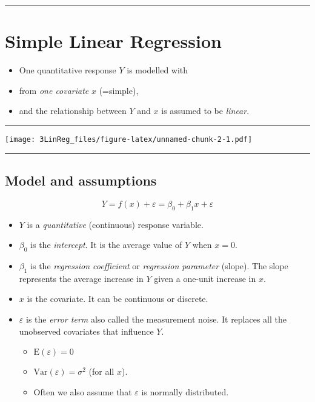 \documentclass[]{article}
\providecommand{\tightlist}{%
  \setlength{\itemsep}{0pt}\setlength{\parskip}{0pt}}
\begin{document}
\begin{center}\rule{0.5\linewidth}{\linethickness}\end{center}

\hypertarget{simple-linear-regression}{%
\section{Simple Linear Regression}\label{simple-linear-regression}}

\begin{itemize}
\tightlist
\item
  One quantitative response \(Y\) is modelled with
\item
  from \emph{one covariate} \(x\) (=simple),
\item
  and the relationship between \(Y\) and \(x\) is assumed to be
  \emph{linear}.
\end{itemize}

\begin{center}\rule{0.5\linewidth}{\linethickness}\end{center}

\texttt{[image: 3LinReg\_files/figure-latex/unnamed-chunk-2-1.pdf]}

\begin{center}\rule{0.5\linewidth}{\linethickness}\end{center}

\hypertarget{model-and-assumptions}{%
\subsection{Model and assumptions}\label{model-and-assumptions}}

\[Y = f(x)+ \varepsilon= \beta_0 + \beta_1 x + \varepsilon\]

\begin{itemize}
\tightlist
\item
  \(Y\) is a \emph{quantitative} (continuous) response variable.
\item
  \(\beta_0\) is the \emph{intercept}. It is the average value of \(Y\)
  when \(x=0\).
\item
  \(\beta_1\) is the \emph{regression coefficient} or \emph{regression
  parameter} (slope). The slope represents the average increase in \(Y\)
  given a one-unit increase in \(x\).
\item
  \(x\) is the covariate. It can be continuous or discrete.
\item
  \(\varepsilon\) is the \emph{error term} also called the measurement
  noise. It replaces all the unobserved covariates that influence \(Y\).

  \begin{itemize}
  \tightlist
  \item
    \(\text{E}(\varepsilon)=0\)
  \item
    \(\text{Var}(\varepsilon)=\sigma^2\) (for all \(x\)).
  \item
    Often we also assume that \(\varepsilon\) is normally distributed.
  \end{itemize}
\end{itemize}
\end{document}
